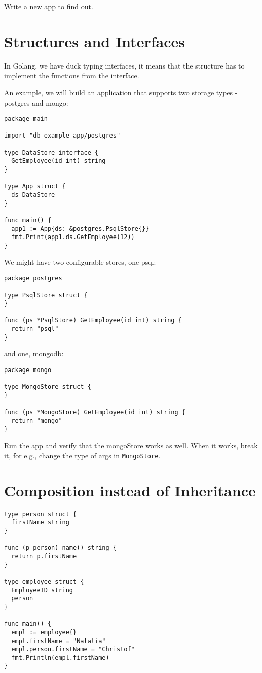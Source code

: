 \documentclass[11pt, letterpaper]{article}
\begin{document}
Write a new app to find out.

\section{Structures and Interfaces}

In Golang, we have duck typing interfaces, it means that the structure has to implement the functions from the interface.

An example, we will build an application that supports two storage types - postgres and mongo:

\begin{verbatim}
package main

import "db-example-app/postgres"

type DataStore interface {
  GetEmployee(id int) string
}

type App struct {
  ds DataStore
}

func main() {
  app1 := App{ds: &postgres.PsqlStore{}}
  fmt.Print(app1.ds.GetEmployee(12))
}
\end{verbatim}

We might have two configurable stores, one psql:

\begin{verbatim}
package postgres

type PsqlStore struct {
}

func (ps *PsqlStore) GetEmployee(id int) string {
  return "psql"
}
\end{verbatim}

and one, mongodb:

\begin{verbatim}
package mongo

type MongoStore struct {
}

func (ps *MongoStore) GetEmployee(id int) string {
  return "mongo"
}
\end{verbatim}

Run the app and verify that the mongoStore works as well. When it works, break it, for e.g., change the type of args in \texttt{MongoStore}.

\section{Composition instead of Inheritance}

\begin{verbatim}
type person struct {
  firstName string
}

func (p person) name() string {
  return p.firstName
}

type employee struct {
  EmployeeID string
  person
}

func main() {
  empl := employee{}
  empl.firstName = "Natalia"
  empl.person.firstName = "Christof"
  fmt.Println(empl.firstName)
}
\end{verbatim}
\end{document}
